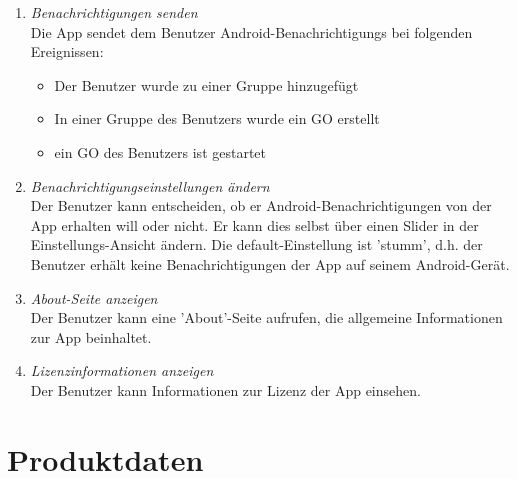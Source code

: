 \documentclass[parskip=full]{scrartcl}
\def\threedigits#1{%
  \ifnum#1<100 0\fi
  \ifnum#1<10 0\fi
  \number#1}
\begin{document}
\begin{enumerate}[label={\textbf{/F\protect\threedigits{\theenumi}0/}}, leftmargin=*, resume]	
 \item \colorbox{shadecolor}{\textit{Benachrichtigungen senden}}\label{Benachrichtigungen senden}\\
	Die App sendet dem Benutzer \glspl{Android-Benachrichtigung} bei folgenden Ereignissen:
	\begin{itemize}
		\item Der Benutzer wurde zu einer Gruppe hinzugefügt
		\item In einer Gruppe des Benutzers wurde ein GO erstellt
		\item ein GO des Benutzers ist gestartet
	\end{itemize}
	\item \colorbox{shadecolor}{\textit{Benachrichtigungseinstellungen ändern}}\label{Benachrichtigungseinstellungen ändern} \\
	Der Benutzer kann entscheiden, ob er Android-Benachrichtigungen von der App erhalten will oder nicht. Er kann dies selbst über einen Slider in der Einstellungs-Ansicht ändern. Die default-Einstellung ist 'stumm', d.h. der Benutzer erhält keine Benachrichtigungen der App auf seinem Android-Gerät.
	\item \textit{About-Seite anzeigen}\label{About} \\
	Der Benutzer kann eine 'About'-Seite aufrufen, die allgemeine Informationen zur App beinhaltet.
	\item \textit{Lizenzinformationen anzeigen}\label{Lizenz} \\
	Der Benutzer kann Informationen zur Lizenz der App einsehen.
\end{enumerate}

\newpage
\section{Produktdaten}
\end{document}
